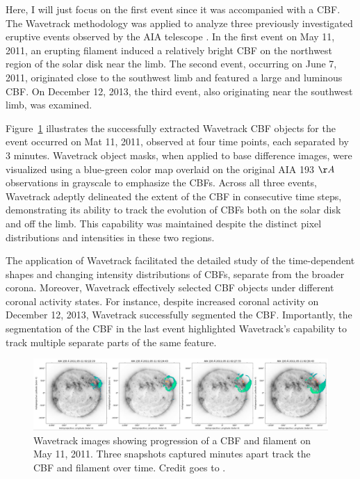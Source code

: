 Here, I will just focus on the first event since it was accompanied with a CBF.
The Wavetrack methodology was applied to analyze three previously investigated eruptive events observed by the AIA telescope \citep{kozarev_2015, kozarev_2017}. In the first event on May 11, 2011, an erupting filament induced a relatively bright CBF on the northwest region of the solar disk near the limb. The second event, occurring on June 7, 2011, originated close to the southwest limb and featured a large and luminous CBF. On December 12, 2013, the third event, also originating near the southwest limb, was examined.

Figure~\ref{fig_wavetrack_cbf_filament} illustrates the successfully extracted Wavetrack CBF objects for the event occurred on Mat 11, 2011, observed at four time points, each separated by 3 minutes. Wavetrack object masks, when applied to base difference images, were visualized using a blue-green color map overlaid on the original AIA 193 $\AA$ observations in grayscale to emphasize the CBFs. Across all three events, Wavetrack adeptly delineated the extent of the CBF in consecutive time steps, demonstrating its ability to track the evolution of CBFs both on the solar disk and off the limb. This capability was maintained despite the distinct pixel distributions and intensities in these two regions.

The application of Wavetrack facilitated the detailed study of the time-dependent shapes and changing intensity distributions of CBFs, separate from the broader corona. Moreover, Wavetrack effectively selected CBF objects under different coronal activity states. For instance, despite increased coronal activity on December 12, 2013, Wavetrack successfully segmented the CBF. Importantly, the segmentation of the CBF in the last event highlighted Wavetrack's capability to track multiple separate parts of the same feature.

\begin{figure}[!htp]
	\centering
	\includegraphics[width=0.9\hsize]{chapter2/figs/fig_1105011_wave_filament_fourpanel_plot.png}
	\caption{Wavetrack images showing progression of a CBF and filament on May 11, 2011. Three snapshots captured  minutes apart track the CBF and filament over time. Credit goes to \citet{stepanyuk_2022}.}
	\label{fig_wavetrack_cbf_filament}
\end{figure}

